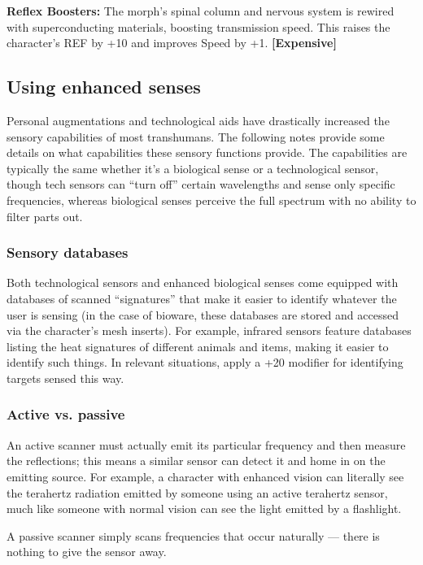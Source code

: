 \textbf{Reflex Boosters:} The morph’s spinal column and nervous system is rewired with superconducting materials, boosting transmission speed. This raises the character’s REF by +10 and improves Speed by +1. \textbf{[Expensive]} 

\subsection{Using enhanced senses} \label{sec:using-enhanced-senses} 

Personal augmentations and technological aids have drastically increased the sensory capabilities of most transhumans. The following notes provide some details on what capabilities these sensory functions provide. The capabilities are typically the same whether it’s a biological sense or a technological sensor, though tech sensors can ``turn off'' certain wavelengths and sense only specific frequencies, whereas biological senses perceive the full spectrum with no ability to filter parts out. 

\subsubsection{Sensory databases} 

Both technological sensors and enhanced biological senses come equipped with databases of scanned ``signatures'' that make it easier to identify whatever the user is sensing (in the case of bioware, these databases are stored and accessed via the character’s mesh inserts). For example, infrared sensors feature databases listing the heat signatures of different animals and items, making it easier to identify such things. In relevant situations, apply a +20 modifier for identifying targets sensed this way. 

\subsubsection{Active vs. passive} 

An active scanner must actually emit its particular frequency and then measure the reflections; this means a similar sensor can detect it and home in on the emitting source. For example, a character with enhanced vision can literally see the terahertz radiation emitted by someone using an active terahertz sensor, much like someone with normal vision can see the light emitted by a flashlight. 

A passive scanner simply scans frequencies that occur naturally --- there is nothing to give the sensor away. 

